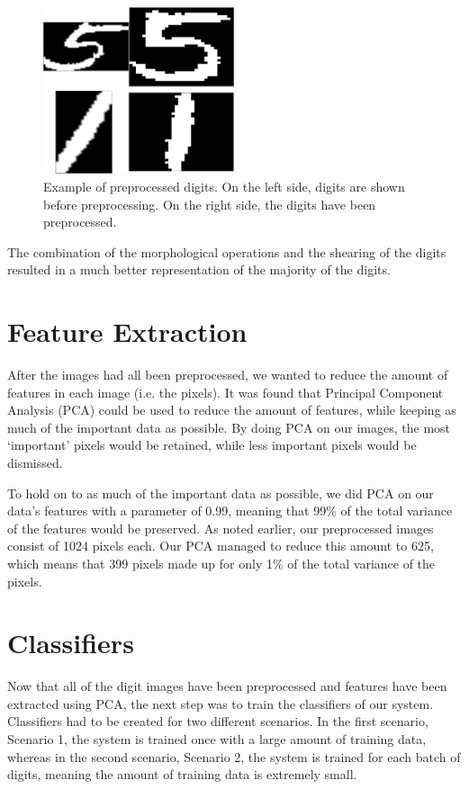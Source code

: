 \documentclass[11pt,twoside,a4paper]{article}
\begin{document}
\begin{figure}[h]
  \centering
  \captionsetup{justification=centering}
  \includegraphics[width=0.5\textwidth]{preprocced.png}
  \caption{Example of preprocessed digits. On the left side, digits are shown before preprocessing. On the right side, the digits have been preprocessed.}
  \label{img:preprocced}
\end{figure}


The combination of the morphological operations and the shearing of the digits resulted in a much better representation of the majority of the digits.\\

\newpage

\section{Feature Extraction}
After the images had all been preprocessed, we wanted to reduce the amount of features in each image (i.e. the pixels). It was found that Principal Component Analysis (PCA) could be used to reduce the amount of features, while keeping as much of the important data as possible. By doing PCA on our images, the most `important' pixels would be retained, while less important pixels would be dismissed.

To hold on to as much of the important data as possible, we did PCA on our data's features with a parameter of 0.99, meaning that 99\% of the total variance of the features would be preserved. As noted earlier, our preprocessed images consist of 1024 pixels each. Our PCA managed to reduce this amount to 625, which means that 399 pixels made up for only 1\% of the total variance of the pixels.


\section{Classifiers}
Now that all of the digit images have been preprocessed and features have been extracted using PCA, the next step was to train the classifiers of our system. Classifiers had to be created for two different scenarios. In the first scenario, Scenario 1, the system is trained once with a large amount of training data, whereas in the second scenario, Scenario 2, the system is trained for each batch of digits, meaning the amount of training data is extremely small.
\end{document}
